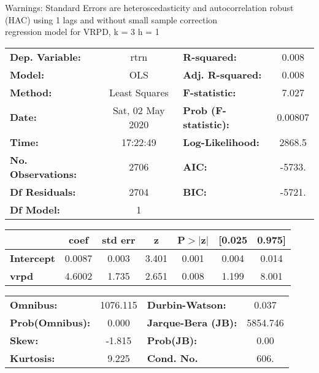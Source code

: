 Warnings: \newline
 [1] Standard Errors are heteroscedasticity and autocorrelation robust (HAC) using 1 lags and without small sample correction\\ 

regression model for VRPD, k = 3 h = 1\begin{center}
\begin{tabular}{lclc}
\toprule
\textbf{Dep. Variable:}    &       rtrn       & \textbf{  R-squared:         } &     0.008   \\
\textbf{Model:}            &       OLS        & \textbf{  Adj. R-squared:    } &     0.008   \\
\textbf{Method:}           &  Least Squares   & \textbf{  F-statistic:       } &     7.027   \\
\textbf{Date:}             & Sat, 02 May 2020 & \textbf{  Prob (F-statistic):} &  0.00807    \\
\textbf{Time:}             &     17:22:49     & \textbf{  Log-Likelihood:    } &    2868.5   \\
\textbf{No. Observations:} &        2706      & \textbf{  AIC:               } &    -5733.   \\
\textbf{Df Residuals:}     &        2704      & \textbf{  BIC:               } &    -5721.   \\
\textbf{Df Model:}         &           1      & \textbf{                     } &             \\
\bottomrule
\end{tabular}
\begin{tabular}{lcccccc}
                   & \textbf{coef} & \textbf{std err} & \textbf{z} & \textbf{P$> |$z$|$} & \textbf{[0.025} & \textbf{0.975]}  \\
\midrule
\textbf{Intercept} &       0.0087  &        0.003     &     3.401  &         0.001        &        0.004    &        0.014     \\
\textbf{vrpd}      &       4.6002  &        1.735     &     2.651  &         0.008        &        1.199    &        8.001     \\
\bottomrule
\end{tabular}
\begin{tabular}{lclc}
\textbf{Omnibus:}       & 1076.115 & \textbf{  Durbin-Watson:     } &    0.037  \\
\textbf{Prob(Omnibus):} &   0.000  & \textbf{  Jarque-Bera (JB):  } & 5854.746  \\
\textbf{Skew:}          &  -1.815  & \textbf{  Prob(JB):          } &     0.00  \\
\textbf{Kurtosis:}      &   9.225  & \textbf{  Cond. No.          } &     606.  \\
\bottomrule
\end{tabular}
\end{center}

